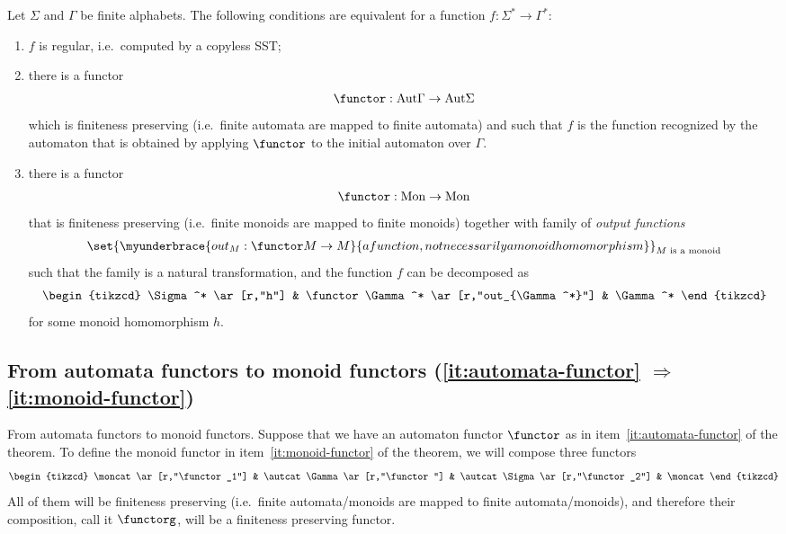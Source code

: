 \begin{theorem}
    Let $\Sigma$ and $\Gamma$ be finite alphabets. The following conditions are equivalent for a function $f : \Sigma^* \to \Gamma^*$: 
    \begin{enumerate}
        \item \label{it:f-is-regular}$f$ is regular, i.e.~computed by a copyless SST; 
        \item \label{it:automata-functor} there is a functor 
        \begin{align*}
        \functor : \autcat \Gamma \to \autcat \Sigma
        \end{align*}
        which is finiteness preserving (i.e.~finite automata are mapped to finite automata) and such that $f$ is the function recognized by the automaton that is obtained by  applying $\functor$ to the initial automaton over $\Gamma$.
        \item \label{it:monoid-functor} there is a functor 
        \begin{align*}
        \functor : \moncat \to \moncat  
        \end{align*}
        that is finiteness preserving (i.e.~finite monoids are mapped to finite monoids)
        together with family of \emph{output functions}
            \begin{align*}
            \set{\myunderbrace{out_M : \functor M \to M}{a function, not necessarily a monoid homomorphism}}_{M \text{ is a monoid}}
            \end{align*}
            such that the family is a natural transformation, and the function $f$ can be decomposed as 
            \[
            \begin{tikzcd}
            \Sigma^* 
            \ar[r,"h"] 
            &
            \functor \Gamma^* 
            \ar[r,"out_{\Gamma^*}"]
            &
            \Gamma^*
            \end{tikzcd}
            \]
            for some monoid homomorphism $h$.
    \end{enumerate}
\end{theorem}



\subsection{From automata functors to monoid functors (\ref{it:automata-functor} $\Rightarrow$ \ref{it:monoid-functor})}
From automata functors to monoid functors. Suppose that we have an automaton functor $\functor$ as in item~\ref{it:automata-functor} of the theorem. To define the monoid functor in item~\ref{it:monoid-functor} of the theorem, we will compose three functors
\[
\begin{tikzcd}
\moncat 
\ar[r,"\functor_1"]
&
\autcat \Gamma 
\ar[r,"\functor"]
&
\autcat \Sigma 
\ar[r,"\functor_2"]
&
\moncat
\end{tikzcd}
\]
All of them will be finiteness preserving (i.e.~finite automata/monoids are mapped to finite automata/monoids), and therefore their composition, call it $\functorg$, will be a finiteness preserving functor. 


